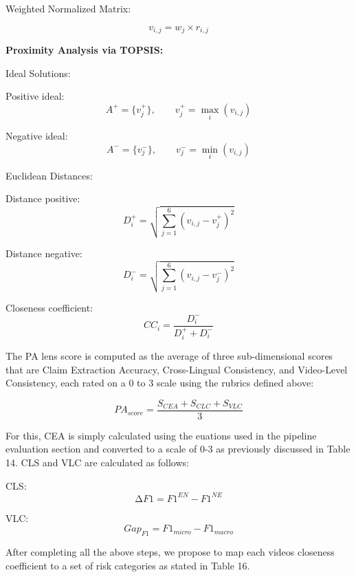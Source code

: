 \documentclass[]{article}
\begin{document}
Weighted Normalized Matrix:

\[
v_{i,j} = w_j \times r_{i,j}
\]

\textbf{Proximity Analysis via TOPSIS:}

Ideal Solutions:

Positive ideal:
\[
A^{+} = \{v_j^{+}\}, \qquad v_j^{+} = \max_i(v_{i,j})
\]

Negative ideal:
\[
A^{-} = \{v_j^{-}\}, \qquad v_j^{-} = \min_i(v_{i,j})
\]

Euclidean Distances:

Distance positive:
\[
D_i^{+} = \sqrt{\sum_{j=1}^{6}(v_{i,j} - v_j^{+})^2}
\]

Distance negative:
\[
D_i^{-} = \sqrt{\sum_{j=1}^{6}(v_{i,j} - v_j^{-})^2}
\]

Closeness coefficient:
\[
CC_i = \frac{D_i^{-}}{D_i^{+} + D_i^{-}}
\]

The PA lens score is computed as the average of three sub-dimensional scores that are Claim Extraction Accuracy, Cross-Lingual Consistency, and
Video-Level Consistency, each rated on a 0 to 3 scale using the rubrics defined above:

\[PA_{score} = \frac{S_{CEA} + S_{CLC} + S_{VLC}}{3}\]

For this, CEA is simply calculated using the euations used in the
pipeline evaluation section and converted to a scale of 0-3 as
previously discussed in Table 14. CLS and VLC are calculated as follows:

CLS: \[\mathrm{\Delta}F1 = F1^{EN} - F1^{NE}\]

VLC:\[Gap_{F1} = F1_{micro} - F1_{macro}\]

After completing all the above steps, we propose to map each
video\textquotesingle s closeness coefficient to a set of risk categories as stated in Table 16.
\end{document}
